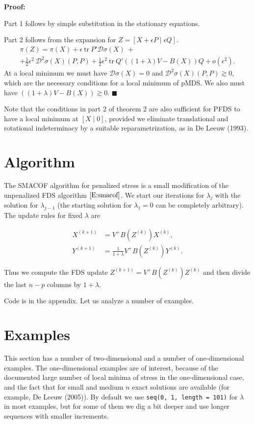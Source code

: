 \documentclass[
  12pt,
]{article}
\begin{document}
\textbf{Proof:}

Part 1 follows by simple substitution in the stationary equations.

Part 2 follows from the expansion for
\(Z=[X+\epsilon P\mid\epsilon Q]\). \begin{multline}\label{E:expand2}
\pi(Z)=\pi(X)+\epsilon\ \text{tr}\ P'\mathcal{D}\sigma(X)\ +\\+\frac12\epsilon^2\ \mathcal{D}^2\sigma(X)(P,P)+\frac12\epsilon^2\ \text{tr}\ Q'((1+\lambda)V-B(X))Q+o(\epsilon^2).
\end{multline} At a local minimum we must have
\(\mathcal{D}\sigma(X)=0\) and \(\mathcal{D}^2\sigma(X)(P,P)\gtrsim 0\),
which are the necessary conditions for a local minimum of pMDS. We also
must have \(((1+\lambda)V-B(X))\gtrsim 0\). \(\blacksquare\)

Note that the conditions in part 2 of theorem 2 are also sufficient for
PFDS to have a local minimum at \([X\mid 0]\), provided we eliminate
translational and rotational indeterminacy by a suitable
reparametrization, as in De Leeuw (1993).

\section{Algorithm}\label{algorithm}

The SMACOF algorithm for penalized stress is a small modification of the
unpenalized FDS algorithm \(\eqref{E:smacof}\). We start our iterations
for \(\lambda_j\) with the solution for \(\lambda_{j-1}\) (the starting
solution for \(\lambda_1=0\) can be completely arbitrary). The update
rules for fixed \(\lambda\) are

\begin{align}
X^{(k+1)}&=V^+B(Z^{(k)})X^{(k)},\\
Y^{(k+1)}&=\frac{1}{1+\lambda}V^+B(Z^{(k)})Y^{(k)}.
\end{align}

Thus we compute the FDS update \(Z^{(k+1)}=V^+B(Z^{(k)})Z^{(k)}\) and
then divide the last \(n-p\) columns by \(1+\lambda\).

Code is in the appendix. Let us analyze a number of examples.

\section{Examples}\label{examples}

This section has a number of two-dimensional and a number of
one-dimensional examples. The one-dimensional examples are of interest,
because of the documented large number of local minima of stress in the
one-dimensional case, and the fact that for small and medium \(n\) exact
solutions are available (for example, De Leeuw (2005)). By default we
use \texttt{seq(0,\ 1,\ length\ =\ 101)} for \(\lambda\) in most
examples, but for some of them we dig a bit deeper and use longer
sequences with smaller increments.
\end{document}

